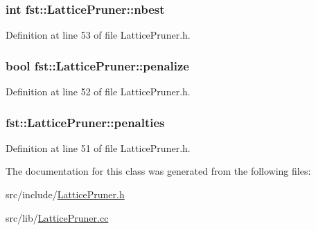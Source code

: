 \subsubsection[{nbest}]{\setlength{\rightskip}{0pt plus 5cm}int fst\+::\+Lattice\+Pruner\+::nbest}\hypertarget{classfst_1_1_lattice_pruner_a8346ec4a44626618420c75c14fdb64f6}{}\label{classfst_1_1_lattice_pruner_a8346ec4a44626618420c75c14fdb64f6}


Definition at line 53 of file Lattice\+Pruner.\+h.

\subsubsection[{penalize}]{\setlength{\rightskip}{0pt plus 5cm}bool fst\+::\+Lattice\+Pruner\+::penalize}\hypertarget{classfst_1_1_lattice_pruner_a812ff9458a41f3a40e60454fefad9c1e}{}\label{classfst_1_1_lattice_pruner_a812ff9458a41f3a40e60454fefad9c1e}


Definition at line 52 of file Lattice\+Pruner.\+h.

\subsubsection[{penalties}]{ fst\+::\+Lattice\+Pruner\+::penalties}\hypertarget{classfst_1_1_lattice_pruner_a4d2c5ebcc9a88bbe7ebdb58523c0b01f}{}\label{classfst_1_1_lattice_pruner_a4d2c5ebcc9a88bbe7ebdb58523c0b01f}


Definition at line 51 of file Lattice\+Pruner.\+h.



The documentation for this class was generated from the following files\+:\begin{DoxyCompactItemize}
\item 
src/include/\hyperlink{_lattice_pruner_8h}{Lattice\+Pruner.\+h}\item 
src/lib/\hyperlink{_lattice_pruner_8cc}{Lattice\+Pruner.\+cc}\end{DoxyCompactItemize}
